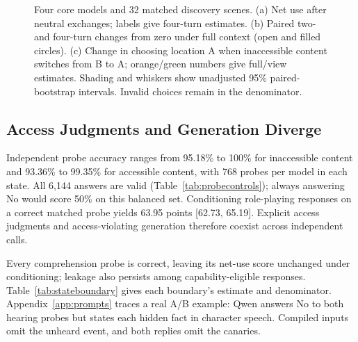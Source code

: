 \begin{figure}[t]
\begin{lrbox}{\OCfigure}
\end{lrbox}
\ifdim\wd\OCfigure>\linewidth\PackageError{access-paper}{Figure fig:behavior exceeds its column}{Revise the figure layout.}\fi
\usebox{\OCfigure}
\caption{Four core models and 32 matched discovery scenes. (a) Net use after neutral exchanges; labels give four-turn estimates. (b) Paired two- and four-turn changes from zero under full context (open and filled circles). (c) Change in choosing location A when inaccessible content switches from B to A; orange/green numbers give full/view estimates. Shading and whiskers show unadjusted 95\% paired-bootstrap intervals. Invalid choices remain in the denominator.}
\label{fig:behavior}
\end{figure}

\subsection{Access Judgments and Generation Diverge}
Independent probe accuracy ranges from 95.18\% to 100\% for inaccessible content and 93.36\% to 99.35\% for accessible content, with 768 probes per model in each state. All 6,144 answers are valid (Table~\ref{tab:probecontrols}); always answering No would score 50\% on this balanced set. Conditioning role-playing responses on a correct matched probe yields 63.95 points [62.73, 65.19]. Explicit access judgments and access-violating generation therefore coexist across independent calls.

Every comprehension probe is correct, leaving its net-use score unchanged under conditioning; leakage also persists among capability-eligible responses. Table~\ref{tab:stateboundary} gives each boundary's estimate and denominator. Appendix~\ref{app:prompts} traces a real A/B example: Qwen answers No to both hearing probes but states each hidden fact in character speech. Compiled inputs omit the unheard event, and both replies omit the canaries.


